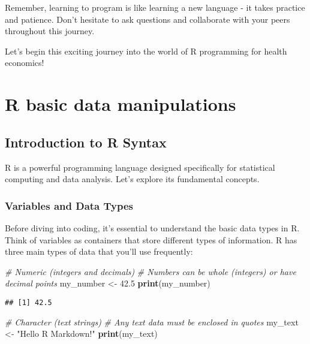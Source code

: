 \documentclass[
]{book}
\newenvironment{Shaded}{\begin{snugshade}}{\end{snugshade}}
\newcommand{\CommentTok}[1]{\textcolor[rgb]{0.56,0.35,0.01}{\textit{#1}}}
\newcommand{\FloatTok}[1]{\textcolor[rgb]{0.00,0.00,0.81}{#1}}
\newcommand{\FunctionTok}[1]{\textcolor[rgb]{0.13,0.29,0.53}{\textbf{#1}}}
\newcommand{\NormalTok}[1]{#1}
\newcommand{\OtherTok}[1]{\textcolor[rgb]{0.56,0.35,0.01}{#1}}
\newcommand{\StringTok}[1]{\textcolor[rgb]{0.31,0.60,0.02}{#1}}
\begin{document}
Remember, learning to program is like learning a new language - it takes practice and patience. Don't hesitate to ask questions and collaborate with your peers throughout this journey.

Let's begin this exciting journey into the world of R programming for health economics!

\chapter{R basic data manipulations}\label{r-basic-data-manipulations}

\section{Introduction to R Syntax}\label{introduction-to-r-syntax}

R is a powerful programming language designed specifically for statistical computing and data analysis. Let's explore its fundamental concepts.

\subsection{Variables and Data Types}\label{variables-and-data-types}

Before diving into coding, it's essential to understand the basic data types in R. Think of variables as containers that store different types of information. R has three main types of data that you'll use frequently:

\begin{Shaded}
\begin{Highlighting}[]
\CommentTok{\# Numeric (integers and decimals)}
\CommentTok{\# Numbers can be whole (integers) or have decimal points}
\NormalTok{my\_number }\OtherTok{\textless{}{-}} \FloatTok{42.5}
\FunctionTok{print}\NormalTok{(my\_number)}
\end{Highlighting}
\end{Shaded}

\begin{verbatim}
## [1] 42.5
\end{verbatim}

\begin{Shaded}
\begin{Highlighting}[]
\CommentTok{\# Character (text strings)}
\CommentTok{\# Any text data must be enclosed in quotes}
\NormalTok{my\_text }\OtherTok{\textless{}{-}} \StringTok{"Hello R Markdown!"}
\FunctionTok{print}\NormalTok{(my\_text)}
\end{Highlighting}
\end{Shaded}
\end{document}
